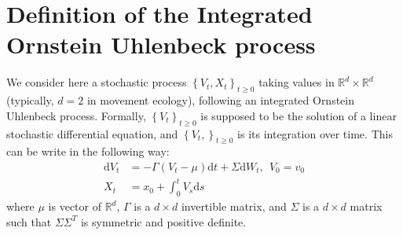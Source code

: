 \documentclass[
]{book}
\newcommand{\rmd}{\text{d}}
\begin{document}
\hypertarget{definition-of-the-integrated-ornstein-uhlenbeck-process}{%
\section{Definition of the Integrated Ornstein Uhlenbeck process}\label{definition-of-the-integrated-ornstein-uhlenbeck-process}}

We consider here a stochastic process \(\left\lbrace V_t, X_t \right\rbrace_{t \geq 0}\) taking values in \(\mathbb{R}^{d}\times \mathbb{R}^{d}\) (typically, \(d = 2\) in movement ecology), following an integrated Ornstein Uhlenbeck process.
Formally, \(\left\lbrace V_t \right\rbrace_{t \geq 0}\) is supposed to be the solution of a linear stochastic differential equation, and \(\left\lbrace V_t, \right\rbrace_{t \geq 0}\) is its integration over time.
This can be write in the following way:
\begin{equation}
\begin{array}{rl}
\rmd V_t &= -\Gamma \left( V_t - \mu \right)\rmd t + \Sigma \rmd W_t,~~V_0 = v_0\\
X_t &= x_0 + \int_0^t V_s \rmd s
\end{array}
\label{eq:IOU-SDE}
\end{equation}
where \(\mu\) is vector of \(\mathbb{R}^d\), \(\Gamma\) is a \(d \times d\) invertible matrix, and \(\Sigma\) is a \(d \times d\) matrix such that \(\Sigma\Sigma^T\) is symmetric and positive definite.
\end{document}
